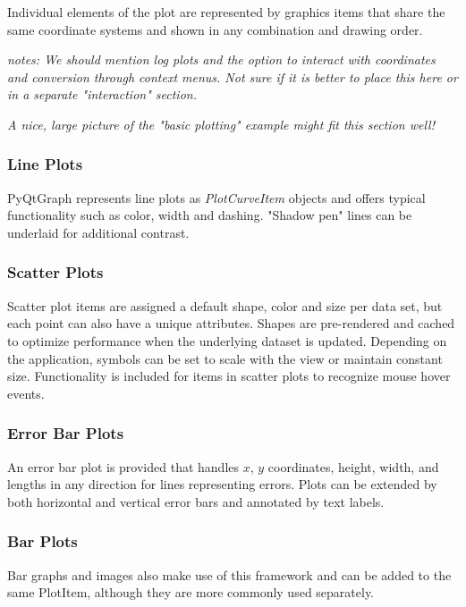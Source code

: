 \documentclass[journal]{vgtc}                %
\begin{document}
Individual elements of the plot are represented by graphics items that share the same coordinate systems and shown in any combination and drawing order.

\emph{notes: We should mention log plots and the option to interact with coordinates and conversion through context menus. Not sure if it is better to place this here or in a separate "interaction" section.}

\emph{
A nice, large picture of the "basic plotting" example might fit this section well!}

\makeBasicPlottingFig


\subsubsection{Line Plots}
PyQtGraph represents line plots as \emph{PlotCurveItem} objects and offers typical functionality such as color, width and dashing. "Shadow pen" lines can be underlaid for additional contrast. 


\subsubsection{Scatter Plots}

Scatter plot items are assigned a default shape, color and size per data set, but each point can also have a unique attributes. Shapes are pre-rendered and cached to optimize performance when the underlying dataset is updated. Depending on the application, symbols can be set to scale with the view or maintain constant size.  Functionality is included for items in scatter plots to recognize mouse hover events.

\subsubsection{Error Bar Plots}

An error bar plot is provided that handles $x$, $y$ coordinates, height, width, and lengths in any direction for lines representing errors.  Plots can be extended by both horizontal and vertical error bars and annotated by text labels.

\subsubsection{Bar Plots}

Bar graphs and images also make use of this framework and can be added to the same PlotItem, although they are more commonly used separately.
\end{document}
